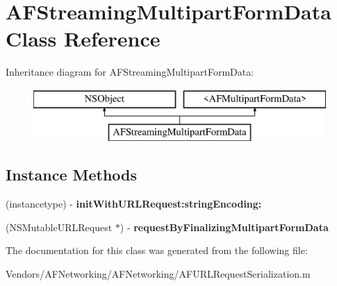 \hypertarget{interface_a_f_streaming_multipart_form_data}{}\section{A\+F\+Streaming\+Multipart\+Form\+Data Class Reference}
\label{interface_a_f_streaming_multipart_form_data}
Inheritance diagram for A\+F\+Streaming\+Multipart\+Form\+Data\+:\begin{figure}[H]
\begin{center}
\leavevmode
\includegraphics[height=2.000000cm]{interface_a_f_streaming_multipart_form_data}
\end{center}
\end{figure}
\subsection*{Instance Methods}
\begin{DoxyCompactItemize}
\item 
\hypertarget{interface_a_f_streaming_multipart_form_data_a2e2cf245d469c301bdcb052e5f0ef340}{}(instancetype) -\/ {\bfseries init\+With\+U\+R\+L\+Request\+:string\+Encoding\+:}\label{interface_a_f_streaming_multipart_form_data_a2e2cf245d469c301bdcb052e5f0ef340}

\item 
\hypertarget{interface_a_f_streaming_multipart_form_data_abbd01865c8d7c04527345d34c08db293}{}(N\+S\+Mutable\+U\+R\+L\+Request $\ast$) -\/ {\bfseries request\+By\+Finalizing\+Multipart\+Form\+Data}\label{interface_a_f_streaming_multipart_form_data_abbd01865c8d7c04527345d34c08db293}

\end{DoxyCompactItemize}


The documentation for this class was generated from the following file\+:\begin{DoxyCompactItemize}
\item 
Vendors/\+A\+F\+Networking/\+A\+F\+Networking/A\+F\+U\+R\+L\+Request\+Serialization.\+m\end{DoxyCompactItemize}
